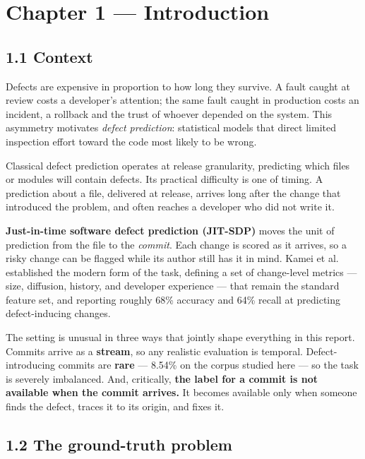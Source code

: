 \chapter{Chapter 1 --- Introduction}\label{chapter-1-introduction}

\section{1.1 Context}\label{context}

Defects are expensive in proportion to how long they survive. A fault
caught at review costs a developer's attention; the same fault caught in
production costs an incident, a rollback and the trust of whoever
depended on the system. This asymmetry motivates \emph{defect
prediction}: statistical models that direct limited inspection effort
toward the code most likely to be wrong.

Classical defect prediction operates at release granularity, predicting
which files or modules will contain defects. Its practical difficulty is
one of timing. A prediction about a file, delivered at release, arrives
long after the change that introduced the problem, and often reaches a
developer who did not write it.

\textbf{Just-in-time software defect prediction (JIT-SDP)} moves the
unit of prediction from the file to the \emph{commit}. Each change is
scored as it arrives, so a risky change can be flagged while its author
still has it in mind. Kamei et al. \citep{kamei2013jit} established the
modern form of the task, defining a set of change-level metrics ---
size, diffusion, history, and developer experience --- that remain the
standard feature set, and reporting roughly 68\% accuracy and 64\%
recall at predicting defect-inducing changes.

The setting is unusual in three ways that jointly shape everything in
this report. Commits arrive as a \textbf{stream}, so any realistic
evaluation is temporal. Defect-introducing commits are \textbf{rare} ---
8.54\% on the corpus studied here --- so the task is severely
imbalanced. And, critically, \textbf{the label for a commit is not
available when the commit arrives.} It becomes available only when
someone finds the defect, traces it to its origin, and fixes it.

\section{1.2 The ground-truth problem}\label{the-ground-truth-problem}


